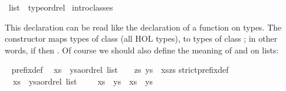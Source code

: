 %
\begin{isabellebody}%
\def\isabellecontext{Overloading}%
\isanewline
\isamarkupfalse%
\ list\ {\isacharcolon}{\isacharcolon}\ {\isacharparenleft}type{\isacharparenright}ordrel\isanewline
\isamarkupfalse%
\ intro{\isacharunderscore}classes\isamarkupfalse%
%
\begin{isamarkuptext}%
\noindent
This  declaration can be read like the declaration of
a function on types.  The constructor  maps types of class  (all HOL types), to types of class ;
in other words,
if  then .
Of course we should also define the meaning of \isa{{\isacharless}{\isacharless}{\isacharequal}} and
\isa{{\isacharless}{\isacharless}} on lists:%
\end{isamarkuptext}%
\isamarkuptrue%
\ {\isacharparenleft}\isanewline
prefix{\isacharunderscore}def{\isacharcolon}\isanewline
\ \ {\isachardoublequote}xs\ {\isacharless}{\isacharless}{\isacharequal}\ {\isacharparenleft}ys{\isacharcolon}{\isacharcolon}{\isacharprime}a{\isacharcolon}{\isacharcolon}ordrel\ list{\isacharparenright}\ \ {\isasymequiv}\ \ {\isasymexists}zs{\isachardot}\ ys\ {\isacharequal}\ xs{\isacharat}zs{\isachardoublequote}\isanewline
strict{\isacharunderscore}prefix{\isacharunderscore}def{\isacharcolon}\isanewline
\ \ {\isachardoublequote}xs\ {\isacharless}{\isacharless}\ {\isacharparenleft}ys{\isacharcolon}{\isacharcolon}{\isacharprime}a{\isacharcolon}{\isacharcolon}ordrel\ list{\isacharparenright}\ \ \ {\isasymequiv}\ \ xs\ {\isacharless}{\isacharless}{\isacharequal}\ ys\ {\isasymand}\ xs\ {\isasymnoteq}\ ys{\isachardoublequote}\isamarkupfalse%
\isanewline
\isamarkupfalse%
\end{isabellebody}%

